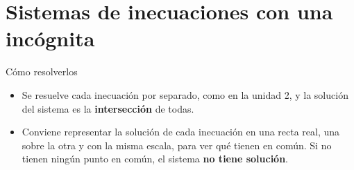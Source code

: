 \documentclass[11pt,a4paper]{article}
\begin{document}
\section{Sistemas de inecuaciones con una incógnita}\hypertarget{sec3}{}
\begin{fmprop}{Cómo resolverlos}
\begin{itemize}
\item Se resuelve cada inecuación por separado, como en la unidad 2, y la solución del sistema es la \textbf{intersección} de todas.
\item Conviene representar la solución de cada inecuación en una recta real, una sobre la otra y con la misma escala, para ver qué tienen en común. Si no tienen ningún punto en común, el sistema \textbf{no tiene solución}.
\end{itemize}
\end{fmprop}
\end{document}
